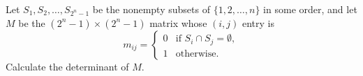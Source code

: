 Let $S_1, S_2, \dots, S_{2^n - 1}$ be the nonempty subsets of $\{1, 2, \dots, n\}$ in some order, and let $M$ be the $(2^n - 1) \times (2^n - 1)$ matrix whose $(i, j)$ entry is
\[m_{ij} = \left\{
\begin{array}{cl}
0 & \text{if $S_i \cap S_j = \emptyset$}, \\
1 & \text{otherwise}.
\end{array}
\right.\]Calculate the determinant of $M$.